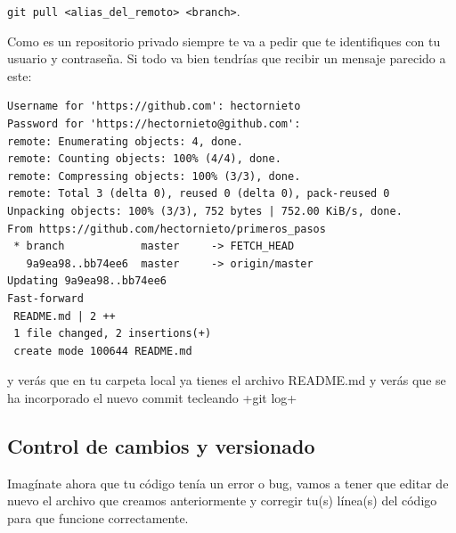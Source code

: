 \documentclass[a5paper,10pt]{article}
\begin{document}
\begin{enumerate}
      \verb+git pull <alias_del_remoto> <branch>+. 
      
      Como es un repositorio privado siempre te va a pedir que te identifiques con tu usuario y contraseña. Si todo va bien tendrías que recibir un mensaje parecido a este:
      
      \begin{lstlisting}[style=custom]
Username for 'https://github.com': hectornieto
Password for 'https://hectornieto@github.com': 
remote: Enumerating objects: 4, done.
remote: Counting objects: 100% (4/4), done.
remote: Compressing objects: 100% (3/3), done.
remote: Total 3 (delta 0), reused 0 (delta 0), pack-reused 0
Unpacking objects: 100% (3/3), 752 bytes | 752.00 KiB/s, done.
From https://github.com/hectornieto/primeros_pasos
 * branch            master     -> FETCH_HEAD
   9a9ea98..bb74ee6  master     -> origin/master
Updating 9a9ea98..bb74ee6
Fast-forward
 README.md | 2 ++
 1 file changed, 2 insertions(+)
 create mode 100644 README.md
      \end{lstlisting}
      y verás que en tu carpeta local ya tienes el archivo README.md y verás que se ha incorporado el nuevo commit tecleando \cverb+git log+
      
    \end{enumerate}
  
  \subsection{Control de cambios y versionado}
    Imagínate ahora que tu código tenía un error o bug, vamos a tener que editar de nuevo el archivo que creamos anteriormente y corregir tu(s) línea(s) del código para que funcione correctamente. 
    
\end{document}
